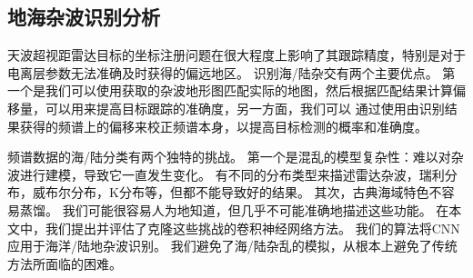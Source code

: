 \subsection{地海杂波识别分析}
天波超视距雷达目标的坐标注册问题在很大程度上影响了其跟踪精度，特别是对于电离层参数无法准确及时获得的偏远地区。 识别海/陆杂交有两个主要优点。 第一个是我们可以使用获取的杂波地形图匹配实际的地图，然后根据匹配结果计算偏移量，可以用来提高目标跟踪的准确度，另一方面，我们可以 通过使用由识别结果获得的频谱上的偏移来校正频谱本身，以提高目标检测的概率和准确度。

频谱数据的海/陆分类有两个独特的挑战。 第一个是混乱的模型复杂性：难以对杂波进行建模，导致它一直发生变化。 有不同的分布类型来描述雷达杂波，瑞利分布，威布尔分布，K分布等，但都不能导致好的结果。 其次，古典海域特色不容易蒸馏。 我们可能很容易人为地知道，但几乎不可能准确地描述这些功能。 在本文中，我们提出并评估了克隆这些挑战的卷积神经网络方法。 我们的算法将CNN应用于海洋/陆地杂波识别。 我们避免了海/陆杂乱的模拟，从根本上避免了传统方法所面临的困难。

